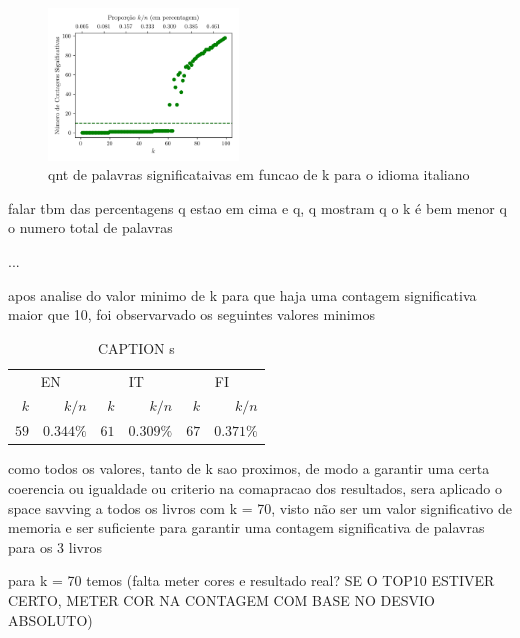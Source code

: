 \documentclass[mirror, portugues]{revdetua}
\begin{document}
\begin{figure}[H]
    \centering
    \includegraphics[width=0.45\textwidth]{../assets/ss_signcount.png}
    \caption{qnt de palavras significataivas em funcao de k para o idioma italiano}
    \label{fig:meaningful_wordscount_k}
\end{figure}

falar tbm das percentagens q estao em cima e q, q mostram q o k é bem menor q o numero total de palavras

...

apos analise do valor minimo de k para que haja uma contagem significativa maior que 10, foi observarvado os seguintes valores minimos

\begin{table}[H]
\centering
\caption{CAPTION s}
\label{table:min_k_for_SStop10}
\begin{tabular}{rr|rr|rr}
\toprule
\multicolumn{2}{c}{EN} & \multicolumn{2}{c}{IT} & \multicolumn{2}{c}{FI} \\
$k$ & $k/n$ & $k$ & $k/n$ & $k$ & $k/n$ \\
\midrule
$59$ & $0.344\%$ & $61$ & $0.309\%$ & $67$ & $0.371\%$ \\
\bottomrule
\end{tabular}
\end{table}

como todos os valores, tanto de k sao proximos, de modo a garantir uma certa coerencia ou igualdade ou criterio na comapracao dos resultados, sera aplicado o space savving a todos os livros com k = 70, visto não ser um valor significativo de memoria e ser suficiente para garantir uma contagem significativa de palavras para os 3 livros

para k = 70 temos (falta meter cores e resultado real? SE O TOP10 ESTIVER CERTO, METER COR NA CONTAGEM COM BASE NO DESVIO ABSOLUTO)
\end{document}
